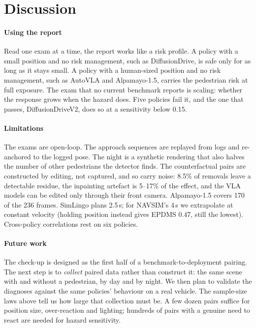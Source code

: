 \section{Discussion}
\label{sec:discussion}

\paragraph{Using the report}
Read one exam at a time, the report works like a risk profile. A
policy with a small position and no risk management, such as DiffusionDrive, is safe only for as long
as it stays small. A policy with a human-sized position and no risk management, such as AutoVLA and
Alpamayo-1.5, carries the pedestrian risk at full exposure. The exam that no current benchmark reports is scaling: whether the response grows when the hazard
does. Five policies fail it, and the one that passes, DiffusionDriveV2, does so at a sensitivity below
0.15.

\paragraph{Limitations}
The exams are open-loop. The approach sequences are replayed from logs and re-anchored to the logged
pose. The night is a synthetic rendering that also halves the number of other pedestrians the detector
finds. The counterfactual pairs are constructed by editing, not captured, and so carry noise: 8.5\% of
removals leave a detectable residue, the inpainting artefact is 5--17\% of the effect, and the VLA
models can be edited only through their front camera. Alpamayo-1.5 covers 170 of the 236 frames. SimLingo plans 2.5\,s; for NAVSIM's 4\,s we extrapolate at constant velocity (holding position instead gives EPDMS 0.47, still the lowest).
Cross-policy correlations rest on six policies.

\paragraph{Future work}
The check-up is designed as the first half of a benchmark-to-deployment pairing. The next step is to
\emph{collect} paired data rather than construct it: the same scene with and without a pedestrian, by
day and by night. We then plan to validate the diagnoses against the same policies' behaviour on a real
vehicle. The sample-size laws above tell us how large that collection must be. A few dozen pairs
suffice for position size, over-reaction and lighting; hundreds of pairs with a genuine need to react
are needed for hazard sensitivity.

